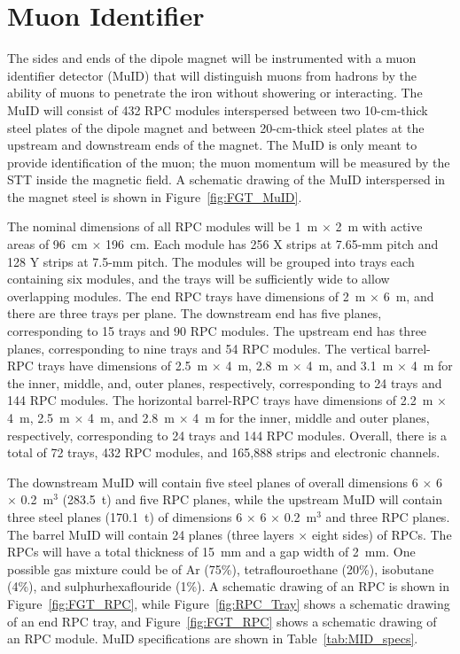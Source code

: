 \section{Muon Identifier}
\label{sec:nd-nnd-muid}

The sides and ends of the dipole magnet will be instrumented
with a muon identifier
detector (MuID) that will distinguish muons from hadrons by the ability 
of muons to penetrate the iron without showering or interacting.
The MuID will consist of 432 RPC modules
interspersed between two 10-cm-thick steel plates of the 
dipole magnet and between 20-cm-thick steel plates at the upstream and
downstream ends of the magnet. 
The MuID is only meant to provide %
identification of the 
muon; the muon momentum %
will be measured by the STT inside the 
magnetic field. A schematic drawing of the MuID 
interspersed in the magnet steel is shown in Figure~\ref{fig:FGT_MuID}.

The nominal dimensions of all RPC modules will be 1~m $\times$ 2~m with
active areas of 96~cm $\times$ 196~cm. Each
module has 256 X strips
at 7.65-mm pitch and 128 Y strips at 7.5-mm pitch. The modules
will be grouped into trays each containing six modules, and the trays will
be sufficiently wide to allow overlapping modules. 
The end RPC trays have dimensions of 2~m $\times$ 6~m, and there are three trays per plane.
The downstream end has five planes, corresponding to 15 trays and 90 RPC modules.
The upstream end has three planes, corresponding to nine trays and 54 RPC modules.
The vertical barrel-RPC trays have dimensions of 2.5~m $\times$ 4~m, 2.8~m $\times$ 4~m, and
3.1~m $\times$ 4~m for the inner, middle, and, outer planes, respectively, corresponding
to 24 trays and 144 RPC modules. The horizontal
barrel-RPC trays have dimensions of 2.2~m $\times$ 4~m, 2.5~m $\times$ 4~m, and
2.8~m $\times$ 4~m for the inner, middle and outer planes, respectively, 
corresponding to 24 trays and 144 RPC modules. Overall, there is a total of
72 trays, 432 RPC modules, and 165,888 strips and electronic channels. 

The downstream MuID will contain five steel planes of 
overall dimensions
6 $\times$ 6 $\times$ 0.2~m$^3$ (283.5~t)
and five RPC planes, while the upstream MuID will contain three steel
planes (170.1~t) of dimensions 6 $\times$ 6 $\times$ 0.2~m$^3$ and three RPC planes. The barrel MuID will contain
24 planes (three layers $\times$ eight sides) of RPCs. The RPCs will have a total thickness 
of 15~mm and a gap width of 2~mm. One possible gas mixture could be %
of Ar (75\%), tetraflouroethane (20\%), isobutane (4\%),
and sulphurhexaflouride (1\%). 
A schematic drawing of an RPC is shown in Figure~\ref{fig:FGT_RPC}, while
Figure~\ref{fig:RPC_Tray} shows a schematic drawing of an end RPC tray,
and Figure~\ref{fig:FGT_RPC} shows a schematic drawing of an RPC module.
MuID specifications are shown in Table~\ref{tab:MID_specs}.

